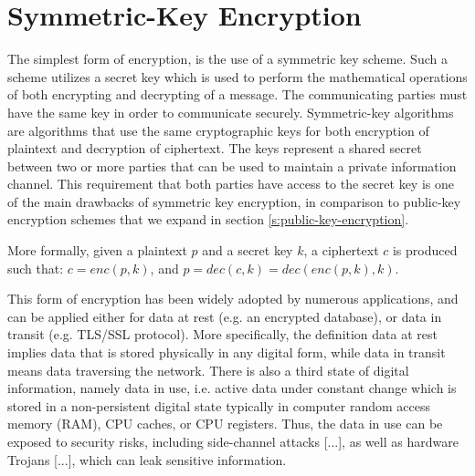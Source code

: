 \section{Symmetric-Key Encryption}\label{s:symmetric-key-encryption}
The simplest form of encryption, is the use of a symmetric key scheme. Such a scheme utilizes a secret key which is used to perform the mathematical operations of both encrypting and decrypting of a message.
The communicating parties must have the same key in order to communicate securely.
Symmetric-key algorithms are algorithms that use the same cryptographic keys for both encryption of plaintext and decryption of ciphertext.
The keys represent a shared secret between two or more parties that can be used to maintain a private information channel.
This requirement that both parties have access to the secret key is one of the main drawbacks of symmetric key encryption, in comparison to public-key encryption schemes that we expand in section \ref{s:public-key-encryption}.

More formally, given a plaintext $p$ and a secret key $k$, a ciphertext $c$ is produced such that:
$c = enc(p, k)$, and $p = dec(c, k) = dec(enc(p, k), k).$

This form of encryption has been widely adopted by numerous applications, and can be applied either for data at rest (e.g. an encrypted database), or data in transit (e.g. TLS/SSL protocol).
More specifically, the definition data at rest implies data that is stored physically in any digital form, while data in transit means data traversing the network.
There is also a third state of digital information, namely data in use, i.e. active data under constant change which is stored in a non-persistent digital state typically in computer random access memory (RAM), CPU caches, or CPU registers.
Thus, the data in use can be exposed to security risks, including side-channel attacks [...], as well as hardware Trojans [...], which can leak sensitive information.
